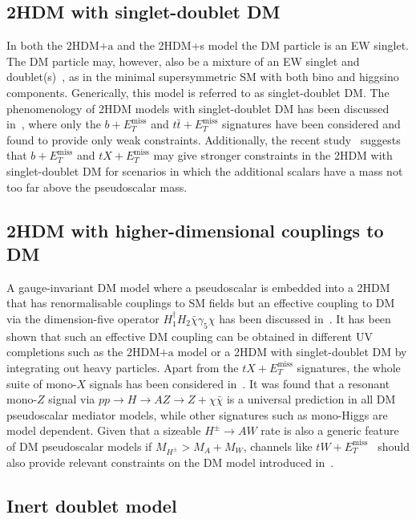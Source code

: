 \documentclass[a4paper, 11pt,notoc]{article}
\newcommand{\MET}{\ensuremath{E_T^\mathrm{miss}}\xspace}
\newcommand{\hdma}{\ensuremath{\textrm{2HDM+a}}\xspace}
\begin{document}
\subsection{2HDM with singlet-doublet DM}

In both the \hdma and the 2HDM+s model the DM particle is  an EW singlet. The DM particle may, however, also be a mixture of an EW singlet and doublet(s)~\cite{Mahbubani:2005pt,Enberg:2007rp,Cohen:2011ec,Cheung:2013dua}, as in the minimal supersymmetric SM with both bino and higgsino components. Generically, this model is referred to as singlet-doublet DM. The phenomenology of 2HDM models with singlet-doublet DM has been discussed in~\cite{Berlin:2015wwa,Arcadi:2018pfo}, where only the $b+\MET$ and $t \bar t+\MET$ signatures have been considered and found to provide only weak constraints. Additionally, the recent study~\cite{Bauer:2017fsw} suggests that $b+\MET$ and $tX+\MET$ may give stronger constraints in the 2HDM with singlet-doublet DM for scenarios in which the additional scalars have a mass not too far above the pseudoscalar mass. 

\subsection{2HDM with  higher-dimensional couplings to DM}

A gauge-invariant DM model where a pseudoscalar is embedded into a 2HDM that has renormalisable couplings to SM fields but an effective coupling to DM via the dimension-five operator $H_1^\dagger H_2 \bar \chi \gamma_5 \chi$ has been  discussed in~\cite{Bauer:2017fsw}. It has been shown that  such an  effective DM coupling can be obtained in different UV completions such as the \hdma model or  a 2HDM with singlet-doublet DM by integrating out heavy particles. Apart from the $t X+\MET$ signatures, the whole suite of mono-$X$ signals has been considered in~\cite{Bauer:2017fsw}. It was found that a resonant mono-$Z$ signal via $pp \to H \to AZ \to  Z + \chi \bar \chi$ is a universal prediction in all DM pseudoscalar mediator models, while other signatures such as mono-Higgs are model dependent. Given that a sizeable $H^\pm \to A W$ rate is also a generic feature of DM pseudoscalar models if $M_{H^\pm} > M_A + M_W$, channels like $tW+\MET$~\cite{Pani:2017qyd} should also  provide relevant constraints on the DM model introduced in~\cite{Bauer:2017fsw}. 

\subsection{Inert doublet model}
\end{document}
